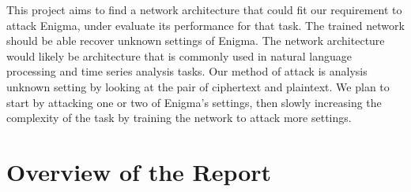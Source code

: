 This project aims to find a network architecture that could fit our requirement to attack Enigma, under evaluate its performance for that task. The trained network should be able recover unknown settings of Enigma. The network architecture would likely be architecture that is commonly used in natural language processing and time series analysis tasks. Our method of attack is analysis unknown setting by looking at the pair of ciphertext and plaintext. We plan to start by attacking one or two of Enigma’s settings, then slowly increasing the complexity of the task by training the network to attack more settings.

\section{Overview of the Report}


